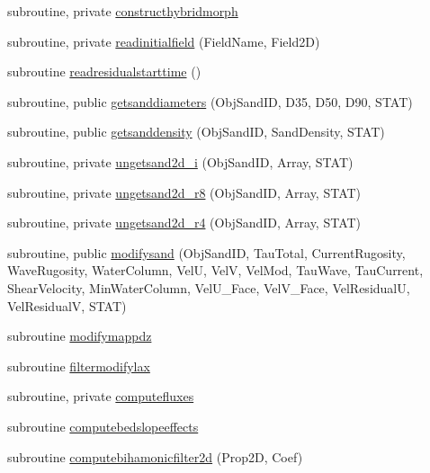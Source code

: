 \begin{DoxyCompactItemize}
subroutine, private \mbox{\hyperlink{namespacemodulesand_a5038864653c40852814080f8d2e82d7b}{constructhybridmorph}}
\item 
subroutine, private \mbox{\hyperlink{namespacemodulesand_aa61dae13b284d7fedb73976eb0340e68}{readinitialfield}} (Field\+Name, Field2D)
\item 
subroutine \mbox{\hyperlink{namespacemodulesand_a402ee8638c7fb9c825536051d1a6c5e8}{readresidualstarttime}} ()
\item 
subroutine, public \mbox{\hyperlink{namespacemodulesand_a622d6481ea9786885f9078db350e31ca}{getsanddiameters}} (Obj\+Sand\+ID, D35, D50, D90, S\+T\+AT)
\item 
subroutine, public \mbox{\hyperlink{namespacemodulesand_a4e0db1b5661a069c0d842ef833c61439}{getsanddensity}} (Obj\+Sand\+ID, Sand\+Density, S\+T\+AT)
\item 
subroutine, private \mbox{\hyperlink{namespacemodulesand_a4daaa1c74789b3c8e2b813c33c5dd7f4}{ungetsand2d\+\_\+i}} (Obj\+Sand\+ID, Array, S\+T\+AT)
\item 
subroutine, private \mbox{\hyperlink{namespacemodulesand_ab4572edb29539b65dc7c75cb29005448}{ungetsand2d\+\_\+r8}} (Obj\+Sand\+ID, Array, S\+T\+AT)
\item 
subroutine, private \mbox{\hyperlink{namespacemodulesand_aebab0f132145eea11b487947d2b9b3f1}{ungetsand2d\+\_\+r4}} (Obj\+Sand\+ID, Array, S\+T\+AT)
\item 
subroutine, public \mbox{\hyperlink{namespacemodulesand_a72127773a460332746476a09b3380e49}{modifysand}} (Obj\+Sand\+ID, Tau\+Total, Current\+Rugosity, Wave\+Rugosity, Water\+Column, VelU, VelV, Vel\+Mod, Tau\+Wave, Tau\+Current, Shear\+Velocity, Min\+Water\+Column, Vel\+U\+\_\+\+Face, Vel\+V\+\_\+\+Face, Vel\+ResidualU, Vel\+ResidualV, S\+T\+AT)
\item 
subroutine \mbox{\hyperlink{namespacemodulesand_a49934851385611f48a356e02d5c0f1e1}{modifymappdz}}
\item 
subroutine \mbox{\hyperlink{namespacemodulesand_a580330ec253695e422a7fa01ca03e69f}{filtermodifylax}}
\item 
subroutine, private \mbox{\hyperlink{namespacemodulesand_a5cbe25a8640cb153443de1585837b7a3}{computefluxes}}
\item 
subroutine \mbox{\hyperlink{namespacemodulesand_a9176419680bd2427b3dbc5e9807c9ca3}{computebedslopeeffects}}
\item 
subroutine \mbox{\hyperlink{namespacemodulesand_a3ea5b505a0fc6d89be163ff10c0f515e}{computebihamonicfilter2d}} (Prop2D, Coef)
\item 

\end{DoxyCompactItemize}
